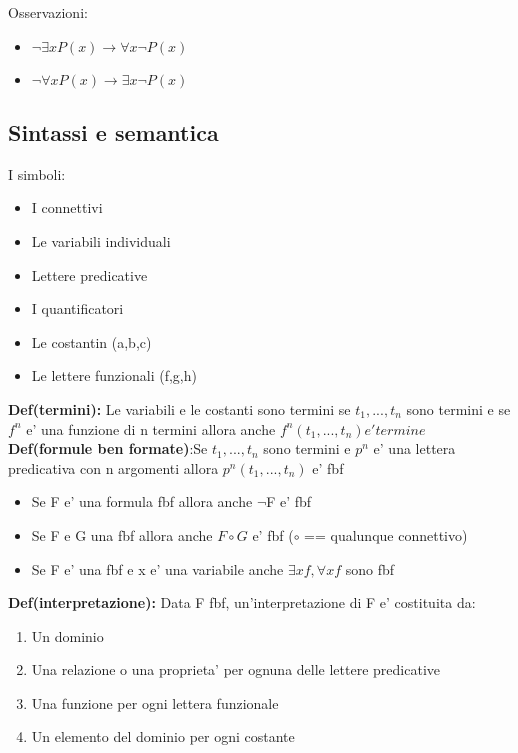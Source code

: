 \documentclass{article}
\begin{document}
        \begin{flushleft}
          Osservazioni:
          \begin{itemize}
            \item $\neg \exists xP(x)\to \forall x \neg P(x)$
            \item $\neg \forall xP(x)\to \exists x \neg P(x)$
          \end{itemize}
        \end{flushleft}
        \subsection{Sintassi e semantica}
        \begin{flushleft}
          I simboli:
          \begin{itemize}
            \item I connettivi
            \item Le variabili individuali
            \item Lettere predicative
            \item I quantificatori 
            \item Le costantin (a,b,c)
            \item Le lettere funzionali (f,g,h)
          \end{itemize}
        \end{flushleft}
        \begin{flushleft}
          \textbf{Def(termini):} Le variabili e le costanti sono termini se $t_1,...,t_n$ sono termini e se $f^n$ e' una funzione di n termini
          allora anche $f^n(t_1,...,t_n) e' termine$
          \textbf{Def(formule ben formate)}:Se $t_1,...,t_n$ sono termini e $p^n$ e' una lettera predicativa con n argomenti allora $p^n(t_1,...,t_n)$ e' fbf
          \begin{itemize}
            \item Se F e' una formula fbf allora anche $\neg$F e' fbf
            \item Se F e G una fbf allora anche $F \circ G$ e' fbf ($\circ$ == qualunque connettivo)
            \item Se F e' una fbf e x e' una variabile anche $\exists xf,\forall xf$ sono fbf
          \end{itemize}
        \end{flushleft}
        \begin{flushleft}
          \textbf{Def(interpretazione):} Data F fbf, un'interpretazione di F e' costituita da:
          \begin{enumerate}
            \item Un dominio
            \item Una relazione o una proprieta' per ognuna delle lettere predicative
            \item Una funzione per ogni lettera funzionale
            \item Un elemento del dominio per ogni costante
          \end{enumerate}
        \end{flushleft}
\end{document}
